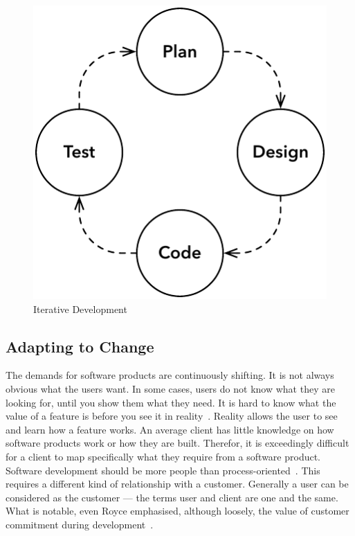 \documentclass[english]{tktltiki2}
\begin{document}
\begin{figure}[h!]

    \centering
    \vspace{1cm}

    \includegraphics[scale = 0.6]{figures/iterative-development}

    \caption{Iterative Development}
    \label{figure:iterative-development}

\end{figure}

\subsection{Adapting to Change}

The demands for software products are continuously shifting. It is not always obvious what the users want. In some cases, users do not know what they are looking for, until you show them what they need. It is hard to know what the value of a feature is before you see it in reality~\cite{Fow05}. Reality allows the user to see and learn how a feature works. An average client has little knowledge on how software products work or how they are built. Therefor, it is exceedingly difficult for a client to map specifically what they require from a software product. Software development should be more people than process-oriented~\cite{Fow05}. This requires a different kind of relationship with a customer. Generally a user can be considered as the customer — the terms user and client are one and the same. What is notable, even Royce emphasised, although loosely, the value of customer commitment during development~\cite{Roy70}.
\end{document}
